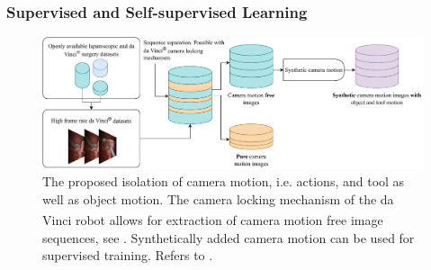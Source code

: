 










\subsubsection{Supervised and Self-supervised Learning}
\label{in:sec:supervised_self_supervised}
\begin{figure}[tb]
    \centering
    \includegraphics[width=\textwidth]{introduction/fig/camera_motion.pdf}
    \caption{The proposed isolation of camera motion, i.e. actions, and tool as well as object motion. The camera locking mechanism of the da Vinci\textsuperscript{\textregistered} robot allows for extraction of camera motion free image sequences, see . Synthetically added camera motion can be used for supervised training. Refers to .}
    \label{in:fig:camera_motion}
\end{figure}



